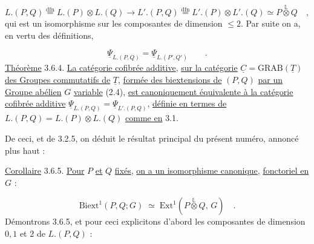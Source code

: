 \begin{equation}\tag{3.6.2}
L.(P,Q) \overset{\mathrm{dfn}}{=} L.(P) \otimes L.(Q) \longrightarrow L'.(P,Q) \overset{\mathrm{dfn}}{=} L'.(P) \otimes L'.(Q) \simeq P \overset{\mathbb{L}}{\otimes} Q \quad ,
\end{equation}
qui est un isomorphisme sur les composantes de dimension $\leq 2$. Par suite on a, en vertu des définitions,

\begin{equation}\tag{3.6.3}
\underline{\Psi}_{L.(P,Q)} = \underline{\Psi}_{L.(P',Q')} \qquad .
\end{equation}
\underline{Théorème} 3.6.4. \underline{La catégorie cofibrée additive}, \underline{sur la catégorie} $\underline{C} = \mathrm{GRAB}(\underline{T})$ \underline{des Groupes commutatifs de} $\underline{T}$, \underline{formée des biextensions de} $(P,Q)$ \underline{par un Groupe abélien} $G$ \underline{variable} (2.4), \underline{est canoniquement équivalente à la catégorie cofibrée additive} $\underline{\Psi}_{L.(P,Q)} = \underline{\Psi}_{L'.(P,Q)}$, \underline{définie en termes de} $L.(P,Q) = L.(P) \otimes L.(Q)$ \underline{comme en} 3.1.

De ceci, et de 3.2.5, on déduit le résultat principal du présent numéro, annoncé plus haut :



\underline{Corollaire} 3.6.5. \underline{Pour} $P$ \underline{et} $Q$ \underline{fixés}, \underline{on a un isomorphisme canonique,} \underline{fonctoriel en} $G$ :

\begin{equation}\tag{3.6.5.1}
\mathrm{Biext}^1(P,Q;G) \;\simeq\; \mathrm{Ext}^1(P \overset{\mathbb{L}}{\otimes} Q,\, G) \quad .
\end{equation}
Démontrons 3.6.5, et pour ceci explicitons d'abord les composantes de dimension $0,1$ et $2$ de $L.(P,Q)$ :

